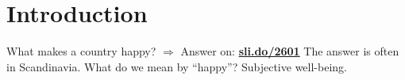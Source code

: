 \documentclass[aspectratio=169,xcolor=dvipsnames, 11pt,mathserif]{beamer}
\begin{document}

\section{Introduction}

\begin{frame}{What makes a country happy?}
    \bbvsp
    \ip {} $\Rightarrow$ Answer on: \textbf{\href{https://sli.do/2601}{sli.do/2601}}
    \ip \centering {}
    \ip The answer is often in Scandinavia. 
    \ip What do we mean by ``happy''? \pause Subjective well-being.
    \ee
\end{frame}
\end{document}
